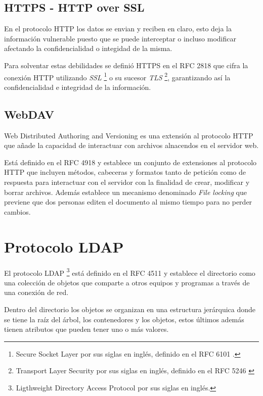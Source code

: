   \subsection {HTTPS - HTTP over SSL}

En el protocolo HTTP los datos se envian y reciben en claro, esto deja la informaci\'{o}n vulnerable puesto que se puede interceptar o incluso modificar afectando la confidencialidad o integidad de la misma.

Para solventar estas debilidades se defini\'{o} HTTPS en el RFC 2818 \cite{rfc2818} que cifra la conexi\'{o}n HTTP utilizando \textit{SSL} \footnote{Secure Socket Layer por sus siglas en ingl\'{e}s, definido en el RFC 6101 \cite{rfc6101}.} o su sucesor \textit{TLS} \footnote{Transport Layer Security por sus siglas en ingl\'{e}s, definido en el RFC 5246 \cite{rfc5246}}, garantizando as\'{i} la confidencialidad e integridad de la informaci\'{o}n.

  \subsection {WebDAV}

Web Distributed Authoring and Versioning es una extensi\'{o}n al protocolo HTTP que a\~{n}ade la capacidad de interactuar con archivos alnacendos en el servidor web.

Est\'{a} definido en el RFC 4918 \cite{rfc4918} y establece un conjunto de extensiones al protocolo HTTP que incluyen m\'{e}todos, cabeceras y formatos tanto de petici\'{o}n como de respuesta para interactuar con el servidor con la finalidad de crear, modificar y borrar archivos. Adem\'{a}s establece un mecanismo denominado \textit{File locking} que previene que dos personas editen el documento al mismo tiempo para no perder cambios.

\section {Protocolo LDAP}

El protocolo LDAP \footnote{Ligthweight Directory Access Protocol por sus siglas en ingl\'{e}s.} est\'{a} definido en el RFC 4511 \cite{rfc4511} y establece el directorio como una colecci\'{o}n de objetos que comparte a otros equipos y programas a trav\'{e}s de una conexi\'{o}n de red.

Dentro del directorio los objetos se organizan en una estructura jer\'{a}rquica donde se tiene la ra\'{i}z del \'{a}rbol, los contenedores y los objetos, estos \'{u}ltimos adem\'{a}s tienen atributos que pueden tener uno o m\'{a}s valores.

